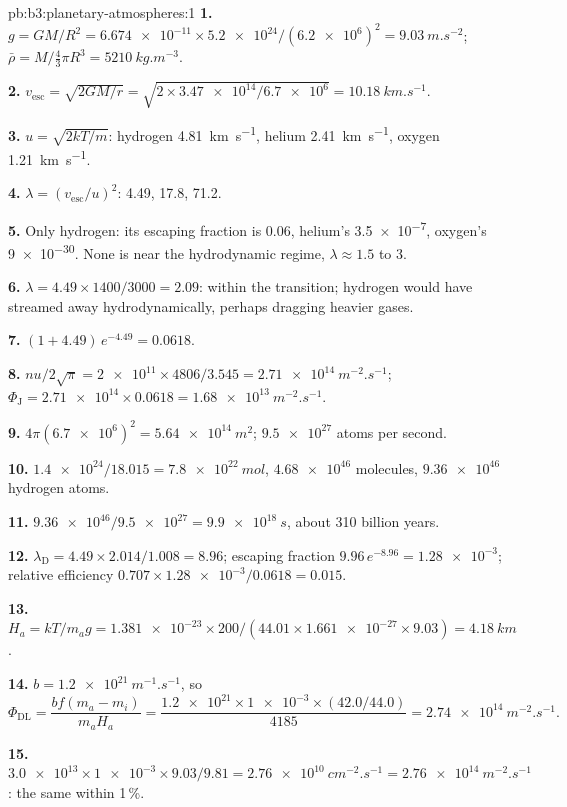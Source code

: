\begin{solution}{pb:b3:planetary-atmospheres:1}
\textbf{1.} $g = GM/R^2 = \num{6.674e-11}\times\num{5.2e24}/(\num{6.2e6})^2 =
\qty{9.03}{m.s^{-2}}$; $\bar\rho = M/\tfrac43\pi R^3 = \qty{5210}{kg.m^{-3}}$.

\textbf{2.} $v_\mathrm{esc} = \sqrt{2GM/r} = \sqrt{2\times\num{3.47e14}/\num{6.7e6}}
= \qty{10.18}{km.s^{-1}}$.

\textbf{3.} $u = \sqrt{2kT/m}$: hydrogen \qty{4.81}{km.s^{-1}}, helium
\qty{2.41}{km.s^{-1}}, oxygen \qty{1.21}{km.s^{-1}}.

\textbf{4.} $\lambda = (v_\mathrm{esc}/u)^2$: 4.49, 17.8, 71.2.

\textbf{5.} Only hydrogen: its escaping fraction is 0.06, helium's
\num{3.5e-7}, oxygen's \num{9e-30}. None is near the hydrodynamic regime,
$\lambda \approx 1.5$ to 3.

\textbf{6.} $\lambda = 4.49\times1400/3000 = 2.09$: within the transition;
hydrogen would have streamed away hydrodynamically, perhaps dragging
heavier gases.

\textbf{7.} $(1 + 4.49)\,e^{-4.49} = 0.0618$.

\textbf{8.} $n u/2\sqrt\pi = \num{2e11}\times4806/3.545 = \qty{2.71e14}{m^{-2}.s^{-1}}$;
$\Phi_\mathrm J = \num{2.71e14}\times0.0618 = \qty{1.68e13}{m^{-2}.s^{-1}}$.

\textbf{9.} $4\pi(\num{6.7e6})^2 = \qty{5.64e14}{m^2}$; $\num{9.5e27}$ atoms per
second.

\textbf{10.} $\num{1.4e24}/18.015 = \qty{7.8e22}{mol}$, $\num{4.68e46}$ molecules,
$\num{9.36e46}$ hydrogen atoms.

\textbf{11.} $\num{9.36e46}/\num{9.5e27} = \qty{9.9e18}{s}$, about 310 billion
years.

\textbf{12.} $\lambda_\mathrm D = 4.49\times2.014/1.008 = 8.96$; escaping fraction
$9.96\,e^{-8.96} = \num{1.28e-3}$; relative efficiency $0.707\times
\num{1.28e-3}/0.0618 = 0.015$.

\textbf{13.} $H_a = kT/m_a g = \num{1.381e-23}\times200/(44.01\times\num{1.661e-27}
\times9.03) = \qty{4.18}{km}$.

\textbf{14.} $b = \qty{1.2e21}{m^{-1}.s^{-1}}$, so
\[
\Phi_\mathrm{DL} = \frac{b f(m_a - m_i)}{m_a H_a}
= \frac{\num{1.2e21}\times\num{1e-3}\times(42.0/44.0)}{4185}
= \qty{2.74e14}{m^{-2}.s^{-1}}.
\]

\textbf{15.} $\num{3.0e13}\times\num{1e-3}\times9.03/9.81 =
\qty{2.76e10}{cm^{-2}.s^{-1}} = \qty{2.76e14}{m^{-2}.s^{-1}}$: the same
within 1\,\%.


\end{solution}
